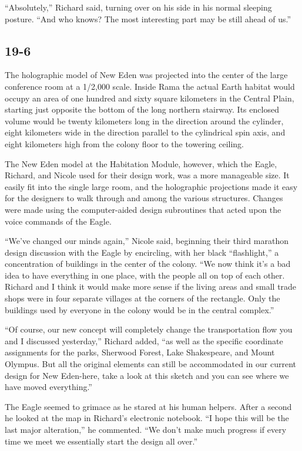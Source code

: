 \documentclass[]{article}
\begin{document}
{“Absolutely,” Richard said, turning over on his side in his normal sleeping posture. “And who knows? The most interesting part may be still ahead of us.”

\subsection{19-6}

The holographic model of New Eden was projected into the center of the large conference room at a 1/2,000 scale. Inside Rama the actual Earth habitat would occupy an area of one hundred and sixty square kilometers in the Central Plain, starting just opposite the bottom of the long northern stairway. Its enclosed volume would be twenty kilometers long in the direction around the cylinder, eight kilometers wide in the direction parallel to the cylindrical spin axis, and eight kilometers high from the colony floor to the towering ceiling.

The New Eden model at the Habitation Module, however, which the Eagle, Richard, and Nicole used for their design work, was a more manageable size. It easily fit into the single large room, and the holographic projections made it easy for the designers to walk through and among the various structures. Changes were made using the computer-aided design subroutines that acted upon the voice commands of the Eagle.

“We’ve changed our minds again,” Nicole said, beginning their third marathon design discussion with the Eagle by encircling, with her black “flashlight,” a concentration of buildings in the center of the colony. “We now think it’s a bad idea to have everything in one place, with the people all on top of each other. Richard and I think it would make more sense if the living areas and small trade shops were in four separate villages at the corners of the rectangle. Only the buildings used by everyone in the colony would be in the central complex.”

“Of course, our new concept will completely change the transportation flow you and I discussed yesterday,” Richard added, “as well as the specific coordinate assignments for the parks, Sherwood Forest, Lake Shakespeare, and Mount Olympus. But all the original elements can still be accommodated in our current design for New Eden-here, take a look at this sketch and you can see where we have moved everything.”

The Eagle seemed to grimace as he stared at his human helpers. After a second he looked at the map in Richard’s electronic notebook. “I hope this will be the last major alteration,” he commented. “We don’t make much progress if every time we meet we essentially start the design all over.”

}
\end{document}
